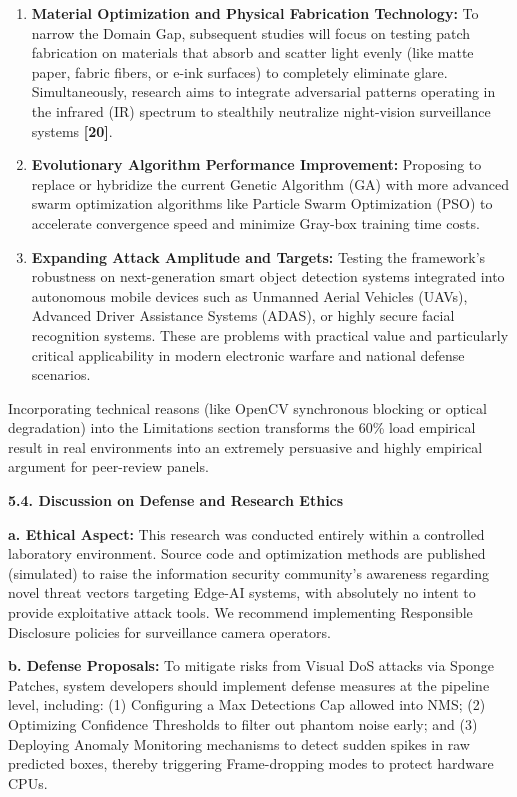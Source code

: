 \documentclass[]{article}
\begin{document}
\begin{enumerate}
\def\labelenumi{\arabic{enumi}.}
\item
  \textbf{Material Optimization and Physical Fabrication Technology:} To narrow the Domain Gap, subsequent studies will focus on testing patch fabrication on materials that absorb and scatter light evenly (like matte paper, fabric fibers, or e-ink surfaces) to completely eliminate glare. Simultaneously, research aims to integrate adversarial patterns operating in the infrared (IR) spectrum to stealthily neutralize night-vision surveillance systems \textbf{{[}20{]}}.
\item
  \textbf{Evolutionary Algorithm Performance Improvement:} Proposing to replace or hybridize the current Genetic Algorithm (GA) with more advanced swarm optimization algorithms like Particle Swarm Optimization (PSO) to accelerate convergence speed and minimize Gray-box training time costs.
\item
  \textbf{Expanding Attack Amplitude and Targets:} Testing the framework's robustness on next-generation smart object detection systems integrated into autonomous mobile devices such as Unmanned Aerial Vehicles (UAVs), Advanced Driver Assistance Systems (ADAS), or highly secure facial recognition systems. These are problems with practical value and particularly critical applicability in modern electronic warfare and national defense scenarios.
\end{enumerate}

Incorporating technical reasons (like OpenCV synchronous blocking or optical degradation) into the Limitations section transforms the 60\% load empirical result in real environments into an extremely persuasive and highly empirical argument for peer-review panels.

\textbf{5.4. Discussion on Defense and Research Ethics}

\textbf{a. Ethical Aspect:} This research was conducted entirely within a controlled laboratory environment. Source code and optimization methods are published (simulated) to raise the information security community's awareness regarding novel threat vectors targeting Edge-AI systems, with absolutely no intent to provide exploitative attack tools. We recommend implementing Responsible Disclosure policies for surveillance camera operators.

\textbf{b. Defense Proposals:} To mitigate risks from Visual DoS attacks via Sponge Patches, system developers should implement defense measures at the pipeline level, including: (1) Configuring a Max Detections Cap allowed into NMS; (2) Optimizing Confidence Thresholds to filter out phantom noise early; and (3) Deploying Anomaly Monitoring mechanisms to detect sudden spikes in raw predicted boxes, thereby triggering Frame-dropping modes to protect hardware CPUs.
\end{document}

